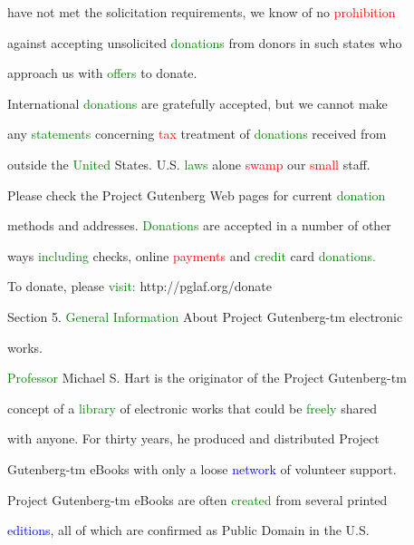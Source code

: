  have not met the solicitation requirements, we know of no \textcolor{red}{prohibition}

 against accepting unsolicited \textcolor{green}{donations} from donors in such states who

 approach us with \textcolor{green}{offers} to donate.



 International \textcolor{green}{donations} are gratefully accepted, but we cannot make

 any \textcolor{green}{statements} concerning \textcolor{red}{tax} treatment of \textcolor{green}{donations} received from

 outside the \textcolor{green}{United} States. U.S. \textcolor{green}{laws} alone \textcolor{red}{swamp} our \textcolor{red}{small} staff.



 Please check the Project Gutenberg Web pages for current \textcolor{green}{donation}

 methods and addresses. \textcolor{green}{Donations} are accepted in a number of other

 ways \textcolor{green}{including} checks, online \textcolor{red}{payments} and \textcolor{green}{credit} card \textcolor{green}{donations.}

 To donate, please \textcolor{green}{visit:} http://pglaf.org/donate





 Section 5. \textcolor{green}{General} \textcolor{green}{Information} About Project Gutenberg-tm electronic

 works.



 \textcolor{green}{Professor} Michael S. Hart is the originator of the Project Gutenberg-tm

 concept of a \textcolor{green}{library} of electronic works that could be \textcolor{green}{freely} \textcolor{BurntOrange}{shared}

 with anyone. For thirty years, he produced and distributed Project

 Gutenberg-tm eBooks with only a loose \textcolor{blue}{network} of \textcolor{BurntOrange}{volunteer} support.





 Project Gutenberg-tm eBooks are often \textcolor{green}{created} from several printed

 \textcolor{blue}{editions,} all of which are confirmed as \textcolor{BurntOrange}{Public} Domain in the U.S.


